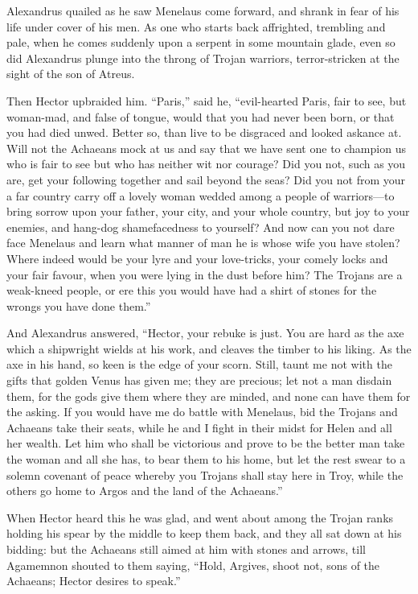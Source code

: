 Alexandrus quailed as he saw Menelaus come forward, and shrank in fear of
his life under cover of his men. As one who starts back affrighted,
trembling and pale, when he comes suddenly upon a serpent in some mountain
glade, even so did Alexandrus plunge into the throng of Trojan warriors,
terror-stricken at the sight of the son of Atreus.

Then Hector upbraided him. “Paris,” said he, “evil-hearted Paris, fair to
see, but woman-mad, and false of tongue, would that you had never been
born, or that you had died unwed. Better so, than live to be disgraced and
looked askance at. Will not the Achaeans mock at us and say that we have
sent one to champion us who is fair to see but who has neither wit nor
courage? Did you not, such as you are, get your following together and
sail beyond the seas? Did you not from your a far country carry off a
lovely woman wedded among a people of warriors—to bring sorrow upon
your father, your city, and your whole country, but joy to your enemies,
and hang-dog shamefacedness to yourself? And now can you not dare face
Menelaus and learn what manner of man he is whose wife you have stolen?
Where indeed would be your lyre and your love-tricks, your comely locks
and your fair favour, when you were lying in the dust before him? The
Trojans are a weak-kneed people, or ere this you would have had a shirt of
stones for the wrongs you have done them.”

And Alexandrus answered, “Hector, your rebuke is just. You are hard as the
axe which a shipwright wields at his work, and cleaves the timber to his
liking. As the axe in his hand, so keen is the edge of your scorn. Still,
taunt me not with the gifts that golden Venus has given me; they are
precious; let not a man disdain them, for the gods give them where they
are minded, and none can have them for the asking. If you would have me do
battle with Menelaus, bid the Trojans and Achaeans take their seats, while
he and I fight in their midst for Helen and all her wealth. Let him who
shall be victorious and prove to be the better man take the woman and all
she has, to bear them to his home, but let the rest swear to a solemn
covenant of peace whereby you Trojans shall stay here in Troy, while the
others go home to Argos and the land of the Achaeans.”

When Hector heard this he was glad, and went about among the Trojan ranks
holding his spear by the middle to keep them back, and they all sat down
at his bidding: but the Achaeans still aimed at him with stones and
arrows, till Agamemnon shouted to them saying, “Hold, Argives, shoot not,
sons of the Achaeans; Hector desires to speak.”

